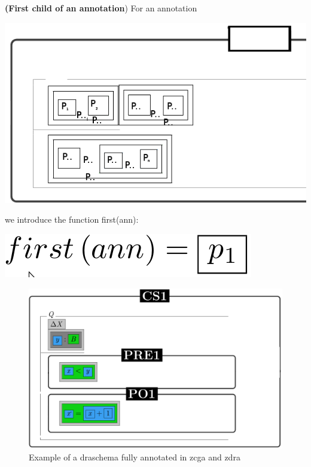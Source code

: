 \begin{defin}
\textbf{(First child of an annotation}) For an annotation 

\includegraphics[scale=0.3]{Figures/Formalising/anns.png}

we introduce the function first(ann):

\includegraphics[scale=0.2]{Figures/Formalising/firstann2.png}

\end{defin}

\begin{figure}[H]
\centering
\includegraphics[scale=0.15]{Figures/Formalising/exampleschema.png}
\caption{Example of a draschema fully annotated in \gls{zcga} and \gls{zdra} \label{fig:draschemaanns}}
\end{figure}

